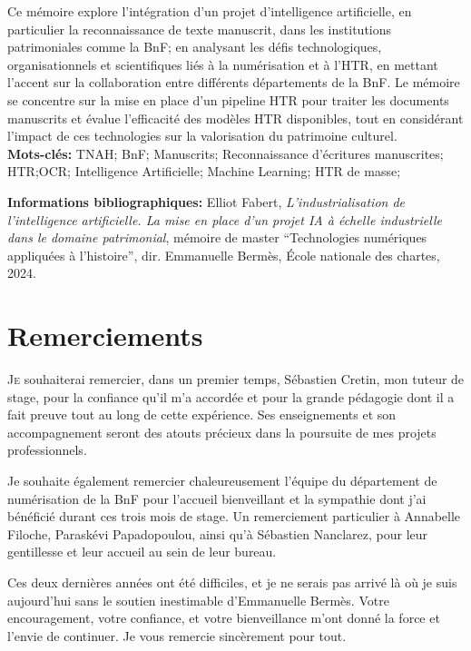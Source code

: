 \documentclass[a4paper,12pt,twoside]{book}
\begin{document}
Ce mémoire explore l'intégration d'un projet d'intelligence artificielle, en particulier la reconnaissance de texte manuscrit, dans les institutions patrimoniales comme la BnF; en analysant les défis technologiques, organisationnels et scientifiques liés à la numérisation et à l’HTR, en mettant l’accent sur la collaboration entre différents départements de la BnF. Le mémoire se concentre sur la mise en place d’un pipeline HTR pour traiter les documents manuscrits et évalue l’efficacité des modèles HTR disponibles, tout en considérant l’impact de ces technologies sur la valorisation du patrimoine culturel. \\	
	
	\textbf{Mots-clés:} TNAH; BnF; Manuscrits; Reconnaissance d'écritures manuscrites; HTR;OCR; Intelligence Artificielle; Machine Learning; HTR de masse;
	
	\textbf{Informations bibliographiques:} Elliot Fabert, \textit{L'industrialisation de l'intelligence artificielle. La mise en place d'un projet IA à échelle industrielle dans le domaine patrimonial}, mémoire de master \enquote{Technologies numériques appliquées à l'histoire}, dir. Emmanuelle Bermès, École nationale des chartes, 2024.
	
		\newpage{\pagestyle{empty}\cleardoublepage}
	
	\chapter{Remerciements}
	
\lettrine{J}e souhaiterai remercier, dans un premier temps, Sébastien Cretin, mon tuteur de stage, pour la confiance qu’il m’a accordée et pour la grande pédagogie dont il a fait preuve tout au long de cette expérience. Ses enseignements et son accompagnement seront des atouts précieux dans la poursuite de mes projets professionnels.

Je souhaite également remercier chaleureusement l’équipe du département de numérisation de la BnF pour l’accueil bienveillant et la sympathie dont j’ai bénéficié durant ces trois mois de stage. Un remerciement particulier à Annabelle Filoche, Paraskévi Papadopoulou, ainsi qu’à Sébastien Nanclarez, pour leur gentillesse et leur accueil au sein de leur bureau.

Ces deux dernières années ont été difficiles, et je ne serais pas arrivé là où je suis aujourd’hui sans le soutien inestimable d’Emmanuelle Bermès. Votre encouragement, votre confiance, et votre bienveillance m’ont donné la force et l’envie de continuer. Je vous remercie sincèrement pour tout.
\end{document}
